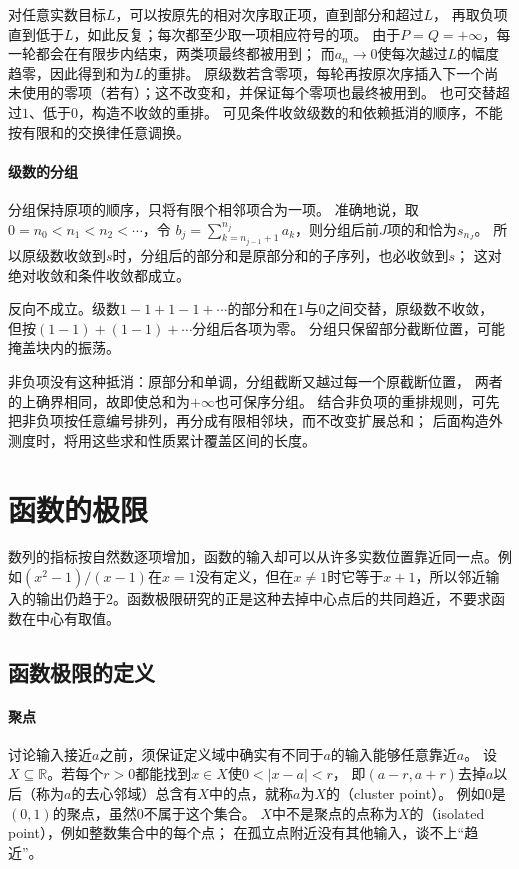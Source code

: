 对任意实数目标$L$，可以按原先的相对次序取正项，直到部分和超过$L$，
再取负项直到低于$L$，如此反复；每次都至少取一项相应符号的项。
由于$P=Q=+\infty$，每一轮都会在有限步内结束，两类项最终都被用到；
而$a_n\to0$使每次越过$L$的幅度趋零，因此得到和为$L$的重排。
原级数若含零项，每轮再按原次序插入下一个尚未使用的零项（若有）；这不改变和，并保证每个零项也最终被用到。
也可交替超过$1$、低于$0$，构造不收敛的重排。
可见条件收敛级数的和依赖抵消的顺序，不能按有限和的交换律任意调换。

\paragraph{级数的分组}
分组保持原项的顺序，只将有限个相邻项合为一项。
准确地说，取$0=n_0<n_1<n_2<\cdots$，令
$b_j=\sum_{k=n_{j-1}+1}^{n_j}a_k$，则分组后前$J$项的和恰为$s_{n_J}$。
所以原级数收敛到$s$时，分组后的部分和是原部分和的子序列，也必收敛到$s$；
这对绝对收敛和条件收敛都成立。

反向不成立。级数$1-1+1-1+\cdots$的部分和在$1$与$0$之间交替，原级数不收敛，
但按$(1-1)+(1-1)+\cdots$分组后各项为零。
分组只保留部分截断位置，可能掩盖块内的振荡。

非负项没有这种抵消：原部分和单调，分组截断又越过每一个原截断位置，
两者的上确界相同，故即使总和为$+\infty$也可保序分组。
结合非负项的重排规则，可先把非负项按任意编号排列，再分成有限相邻块，而不改变扩展总和；
后面构造外测度时，将用这些求和性质累计覆盖区间的长度。

\FloatBarrier
\section{函数的极限}
\label{sec:analysis-function-limits}

数列的指标按自然数逐项增加，函数的输入却可以从许多实数位置靠近同一点。例如$(x^2-1)/(x-1)$在$x=1$没有定义，但在$x\neq1$时它等于$x+1$，所以邻近输入的输出仍趋于$2$。函数极限研究的正是这种去掉中心点后的共同趋近，不要求函数在中心有取值。

\subsection{函数极限的定义}
\paragraph{聚点}

讨论输入接近$a$之前，须保证定义域中确实有不同于$a$的输入能够任意靠近$a$。
设$X\subseteq\mathbb R$。若每个$r>0$都能找到$x\in X$使$0<|x-a|<r$，
即$(a-r,a+r)$去掉$a$以后（称为$a$的去心邻域）总含有$X$中的点，就称$a$为$X$的（cluster point）。
例如$0$是$(0,1)$的聚点，虽然$0$不属于这个集合。
$X$中不是聚点的点称为$X$的（isolated point），例如整数集合中的每个点；
在孤立点附近没有其他输入，谈不上“趋近”。

